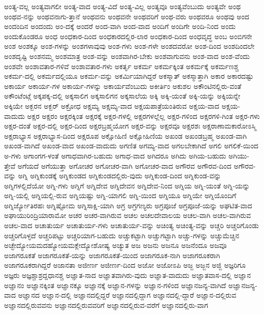 {ಅಂತ್ಯ-ವಲ್ಲ
ಅಂತ್ಯವಾಗಲೀ
ಅಂತ್ಯ-ವಾದ
ಅಂತ್ಯ-ವಿದೆ
ಅಂತ್ಯ-ವಿಲ್ಲ
ಅಂತ್ಯವೂ
ಅಂತ್ಯವೆಂಬುದು
ಅಂತ್ಯವೇ
ಅಂಥ
ಅಂಥವ-ನನ್ನು
ಅಂಥವನಾಗು-ತ್ತಾನೆ
ಅಂಥವನು
ಅಂಥವನೇ
ಅಂಥವರಿಗೆ
ಅಂಥ-ವರು
ಅಂಥವರೂ
ಅಂಥವು
ಅಂದ
ಅಂದಂದಿನ
ಅಂದಂದು
ಅಂ-ದಕ್ಕೆ
ಅಂದರೆ
ಅಂದ-ವಾಗಿ
ಅಂದ-ವಾದ
ಅಂದಿಗೆ
ಅಂದಿಗೇ
ಅಂದಿ-ನಿಂದ
ಅಂದು
ಅಂದುಕೊಂಡರೂ
ಅಂಧ
ಅಂಧಕಾರ-ದಿಂದ
ಅಂಧಕಾರದಲ್ಲಿರ-ಲಾರ
ಅಂಧಕಾರ-ದಿಂದ
ಅಂಧವೃದ್ಧ
ಅಂಬ
ಅಂಬಿಗನೇ
ಅಂಶ
ಅಂಶಕ್ಕೂ
ಅಂಶ-ಗಳನ್ನು
ಅಂಶಗಳಾವುವು
ಅಂಶ-ಗಳು
ಅಂಶ-ಗಳೇ
ಅಂಶದವರೋ
ಅಂಶ-ದಿಂದ
ಅಂಶದಿಂದಲೇ
ಅಂಶದೃಷ್ಟಿ
ಅಂಶನಮ್ಮ
ಅಂಶಮಾತ್ರ
ಅಂಶ-ವನ್ನು
ಅಂಶವಾಗಿರ-ಬೇಕು
ಅಂಶವಾಗುವನು
ಅಂಶ-ವಾದ
ಅಂಶ-ವೆಂದು
ಅಂಶವೇ
ಅಂಶಾವತಾರ-ಗಳಿವೆ
ಅಂಶಾವತಾರ-ಗಳು
ಅಕರ್ತೃ
ಅಕರ್ಮ
ಅಕರ್ಮಕ್ಕಿಂತ
ಅಕರ್ಮಕ್ಕೆ
ಅಕರ್ಮಣಶ್ಚ
ಅಕರ್ಮ-ದಲ್ಲಿ
ಅಕರ್ಮದಲ್ಲಿಯೂ
ಅಕರ್ಮ-ವನ್ನು
ಅಕರ್ಮಿಯಾಗಿದ್ದರೆ
ಅಕಸ್ಮಾತ್
ಅಕಸ್ಮಾತ್ತಾಗಿ
ಅಕಾರ
ಅಕಾರದಷ್ಟು
ಅಕಾರ್ಯ
ಅಕಾರ್ಯ-ಗಳ
ಅಕಾರ್ಯ-ಗಳನ್ನು
ಅಕಾರ್ಯವೆಂಬುದು
ಅಕೀರ್ತಿಂ
ಅಕುಶಲ
ಅಕೌಂಟಿನಲ್ಲಿರು-ವಂತೆ
ಅಕೌಂಟೆಂಟ್ಗೆ
ಅಕ್ಕಪಕ್ಕ-ದಲ್ಲಿ
ಅಕ್ಕಸಾಲಿಗ
ಅಕ್ಕಸಾಲಿಗನ
ಅಕ್ಕಸಾಲೆಯ
ಅಕ್ಕಿ
ಅಕ್ಕಿ-ಯಂತೆ
ಅಕ್ಕಿ-ಯನ್ನು
ಅಕ್ಕಿಯನ್ನೇ
ಅಕ್ಕಿಯೇ
ಅಕ್ಬರನ
ಅಕ್ಬರ್
ಅಕ್ರೋಧ
ಅಕ್ಷಮ್ಯ
ಅಕ್ಷಮ್ಯ-ವಾದ
ಅಕ್ಷಯಪಾತ್ರೆಯಂತಿರುವ
ಅಕ್ಷಯ-ವಾದ
ಅಕ್ಷಯ-ವಾದುದು
ಅಕ್ಷರ
ಅಕ್ಷರಂ
ಅಕ್ಷರಕ್ಕಿಂತ
ಅಕ್ಷರಕ್ಕೆ
ಅಕ್ಷರ-ಗಳಲ್ಲಿ
ಅಕ್ಷರಗಳಲ್ಲೆಲ್ಲ
ಅಕ್ಷರ-ಗಳಿಂದ
ಅಕ್ಷರಗಳಿ-ಗಿಂತ
ಅಕ್ಷರ-ಗಳು
ಅಕ್ಷರ-ದಂತೆ
ಅಕ್ಷರ-ದಲ್ಲಿ
ಅಕ್ಷರ-ದಿಂದ
ಅಕ್ಷರಬ್ರಹ್ಮಯೋಗ
ಅಕ್ಷರ-ವನ್ನು
ಅಕ್ಷರವೂ
ಅಕ್ಷರಶಃ
ಅಕ್ಷರಾಣಾಮಕಾರೋಽಸ್ಮಿ
ಅಕ್ಷರಾಭ್ಯಾಸ
ಅಕ್ಷರಾಭ್ಯಾಸ-ದಿಂದ
ಅಕ್ಷರೂಪ
ಅಕ್ಷೋಹಿಣಿ
ಅಕ್ಷೋಹಿಣಿಯ
ಅಖಂಡ
ಅಖಂಡಬ್ರಹ್ಮ
ಅಖಂಡ-ವಾಗಿ
ಅಖಂಡ-ವಾಗಿದೆ
ಅಖಂಡ-ವಾದ
ಅಖಂಡ-ವಾದುದು
ಅಗಣಿತ
ಅಗಮ್ಯ-ವಾದ
ಅಗಲಬೇಕಾಗಿದೆ
ಅಗಲಿ
ಅಗಲಿಕೆ-ಯಿಂದ
ಅ-ಗಳು
ಅಗಾಂಗಗ-ಳಂತೆ
ಅಗಾಧವಾಗಿರ-ಬಹುದು
ಅಗಾಧ-ವಾದ
ಅಗಿದರೂ
ಅಗಿದು
ಅಗಿಯ-ಬಹುದು
ಅಗಿಯು-ತ್ತೇವೆ
ಅಗೆಯದೆ
ಅಗೆಯುತ್ತಾ
ಅಗೋಚರ
ಅಗೋಚರ-ವಾಗಿ
ಅಗೋಚರ-ವಾದ
ಅಗೌರವ
ಅಗೌರವ-ದಿಂದ
ಅಗೌರವ-ವನ್ನು
ಅಗ್ನಿ
ಅಗ್ನಿಕುಂಡಕ್ಕೆ
ಅಗ್ನಿಕುಂಡದ
ಅಗ್ನಿಕುಂಡದಲ್ಲಿರು-ವುದು
ಅಗ್ನಿಕುಂಡ-ದಿಂದ
ಅಗ್ನಿಕುಂಡ-ವನ್ನು
ಅಗ್ನಿಗಳಲ್ಲಿದೆಯೋ
ಅಗ್ನಿ-ಗಳು
ಅಗ್ನಿಗೆ
ಅಗ್ನಿದೇವ
ಅಗ್ನಿದೇವನ
ಅಗ್ನಿದೇವ-ನಿಂದ
ಅಗ್ನಿಯ
ಅಗ್ನಿ-ಯಂತೆ
ಅಗ್ನಿ-ಯನ್ನು
ಅಗ್ನಿ-ಯಲ್ಲಿ
ಅಗ್ನಿಯಲ್ಲಿ-ರುವ
ಅಗ್ನಿಯಷ್ಟು
ಅಗ್ನಿ-ಯಾಗಲಿ
ಅಗ್ನಿ-ಯಿಂದ
ಅಗ್ನಿಯೂ
ಅಗ್ನಿಯೇ
ಅಗ್ನಿಯೊಂದಿಗೆ
ಅಗ್ನಿರ್ಜ್ಯೋತಿರಹಃ
ಅಗ್ನಿಷ್ಟೋಮ
ಅಗ್ನಿಸಾಕ್ಷಿ-ಯಾಗಿ
ಅಗ್ರ
ಅಗ್ರಗಣ್ಯರು
ಅಗ್ರಪೂಜೆ
ಅಗ್ರಪೂಜೆ-ಯನ್ನು
ಅಘಟಿತ-ವಾದ
ಅಘಾಯುರಿಂದ್ರಿಯಾರಾಮೋ
ಅಚರ
ಅಚರ-ವಾಗಿರುವ
ಅಚಲ
ಅಚಲದೇವಾಲಯ
ಅಚಲ-ವಾಗಿ
ಅಚಲ-ವಾಗಿರುವ
ಅಚಲ-ವಾದ
ಅಚಾತುರ್ಯ
ಅಚಾತುರ್ಯ-ಗಳು
ಅಚಾತುರ್ಯ-ವನ್ನು
ಅಚಿಂತ್ಯ
ಅಚಿಂತ್ಯ-ವನ್ನು
ಅಚ್ಚರಿ
ಅಚ್ಚರಿಗೊಂಡು
ಅಚ್ಚರಿಗೊಳ್ಳದೆ
ಅಚ್ಚರಿಪಟ್ಟು
ಅಚ್ಚರಿಯಾಗ-ಬಹುದು
ಅಚ್ಚುಕಟ್ಟಾಗಿ
ಅಚ್ಚುಗಟ್ಟಾಗಿ
ಅಚ್ಚು-ಗಳನ್ನು
ಅಚ್ಚುಮೆಚ್ಚಿನ
ಅಚ್ಛೇದ್ಯೋಯಮದಹ್ಯೋಯಮಕ್ಲೇದ್ಯೋಶೋಷ್ಯ
ಅಚ್ಯುತ
ಅಜ
ಅಜನು
ಅಜನೂ
ಅಜನೆಂದೂ
ಅಜವೂ
ಅಜಾಗರೂಕತೆ
ಅಜಾಗರೂಕತೆ-ಯನ್ನು
ಅಜಾಗರೂಕತೆ-ಯಿಂದ
ಅಜಾಗರೂಕ-ನಾಗಿ
ಅಜಾಗರೂಕರಾಗಿ
ಅಜಾಗರೂಕರಾಗಿದ್ದರೆ
ಅಜಾನತಾ
ಅಜೀರ್ಣ
ಅಜೀರ್ಣ-ದಿಂದ
ಅಜೋ
ಅಜೋಽಪಿ
ಅಜ್ಜ
ಅಜ್ಜನ
ಅಜ್ಜಿ
ಅಜ್ಞರಿಗೂ
ಅಜ್ಞರು
ಅಜ್ಞಶ್ಚಾಶ್ರದ್ದಧಾನಶ್ಚ
ಅಜ್ಞಾತ-ನಾದ
ಅಜ್ಞಾತವಾಗಿರು-ವುದು
ಅಜ್ಞಾತ-ವಾದುದು
ಅಜ್ಞಾತವಾಸ-ದಲ್ಲಿ
ಅಜ್ಞಾನ
ಅಜ್ಞಾನಂ
ಅಜ್ಞಾನಕ್ಕಿಂತ
ಅಜ್ಞಾನಕ್ಕೂ
ಅಜ್ಞಾನಕ್ಕೆ
ಅಜ್ಞಾನ-ಗಳನ್ನು
ಅಜ್ಞಾನ-ಗಳಿಂದ
ಅಜ್ಞಾನಜನ್ಯ-ವಾಗಿದೆ
ಅಜ್ಞಾನಜನ್ಯ-ವಾದ
ಅಜ್ಞಾನದ
ಅಜ್ಞಾನ-ದಲ್ಲಿ
ಅಜ್ಞಾನದಲ್ಲಿದ್ದರೆ
ಅಜ್ಞಾನದಲ್ಲಿದ್ದಾಗ
ಅಜ್ಞಾನದಲ್ಲಿ-ದ್ದಾರೆ
ಅಜ್ಞಾನ-ದಲ್ಲಿರುವ
ಅಜ್ಞಾನದಲ್ಲಿರುವವನು
ಅಜ್ಞಾನದಲ್ಲಿರುವವರಿಗೆ
ಅಜ್ಞಾನದಲ್ಲಿರುವ-ವರೆಗೆ
ಅಜ್ಞಾನದಲ್ಲಿರು-ವಾಗ
}
